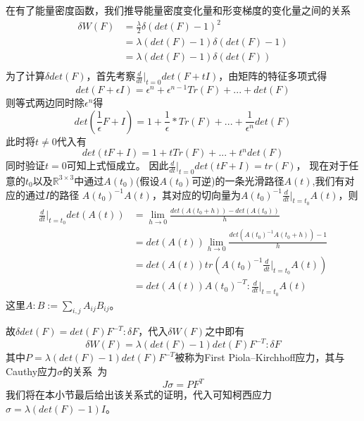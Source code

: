 在有了能量密度函数，我们推导能量密度变化量和形变梯度的变化量之间的关系
\begin{equation}
    \begin{split}
        \delta W(F)&= \frac{\lambda}{2}\delta (det(F) - 1)^2\\
        &= \lambda (det(F) - 1) \delta(det(F) - 1)\\
        &= \lambda (det(F) - 1) \delta(det(F)) \nonumber\\
    \end{split}
\end{equation}
为了计算$\delta det(F)$，首先考察$\frac{d}{dt}\Big |_{t = 0}det(F + tI)$，由矩阵的特征多项式得
$$det(F + \epsilon I) = \epsilon ^n + \epsilon ^{n-1}Tr(F) + ... + det(F)$$
则等式两边同时除$\epsilon^n$得
$$det(\frac{1}{\epsilon}F + I) = 1 + \frac{1}{\epsilon} * Tr(F) + ... + \frac{1}{\epsilon^n} det(F)$$
此时将$t\neq 0$代入有
$$det(tF + I) = 1 + t Tr(F) + ... + t^ndet(F)$$
同时验证$t=0$可知上式恒成立。
因此$\frac{d}{dt}\Big |_{t = 0}det(tF + I) = tr(F)$，
现在对于任意的$t_0$以及$\mathbb{R}^{3 \times 3}$中通过$A(t_0)$(假设$A(t_0)$可逆)的一条光滑路径$A(t)$,我们有对应的通过$I$的路径
$A(t_0)^{-1}A(t)$，其对应的切向量为$A(t_0)^{-1}\frac{d}{dt}\Big |_{t=t_0}A(t)$，则
\begin{equation}
    \begin{split}
        \frac{d}{dt}\Big |_{t = t_0} det(A(t)) &= \lim_{h \to 0} \frac{det(A(t_0 + h)) - det(A(t_0))}{h}\\
        &=det(A(t)) \lim_{h\to 0} \frac{det(A(t_0)^{-1}A(t_0 + h)) -1}{h}\\
        &= det(A(t))tr(A(t_0)^{-1}\frac{d}{dt}\Big |_{t=t_0}A(t))\\
        &= det(A(t))A(t_0)^{-T}:\frac{d}{dt}\Big |_{t=t_0}A(t)
    \end{split}
\end{equation}
这里$A:B:=\sum_{i,j}A_{ij}B_{ij}$。

故$\delta det(F) = det(F) F^{-T}:\delta F$，代入$\delta W(F)$之中即有$$\delta W(F) = \lambda (det(F) - 1)det(F) F^{-T}:\delta F$$
其中$P = \lambda (det(F) - 1)det(F)F^{-T}$被称为First Piola–Kirchhoff应力，其与Cauthy应力$\sigma$的关系~\cite{marsden1994mathematical}为
$$J\sigma = PF^{T}$$
我们将在本小节最后给出该关系式的证明，代入可知柯西应力$\sigma = \lambda (det(F) - 1)I$。


